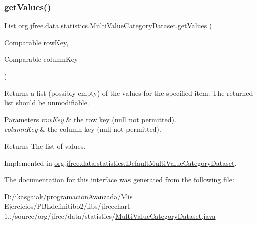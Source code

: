 \subsubsection{\texorpdfstring{get\+Values()}{getValues()}\hspace{0.1cm}{\footnotesize\ttfamily [2/2]}}
{\footnotesize\ttfamily List org.\+jfree.\+data.\+statistics.\+Multi\+Value\+Category\+Dataset.\+get\+Values (\begin{DoxyParamCaption}\item[{Comparable}]{row\+Key,  }\item[{Comparable}]{column\+Key }\end{DoxyParamCaption})}

Returns a list (possibly empty) of the values for the specified item. The returned list should be unmodifiable.


\begin{DoxyParams}{Parameters}
{\em row\+Key} & the row key ({\ttfamily null} not permitted). \\
\hline
{\em column\+Key} & the column key ({\ttfamily null} not permitted).\\
\hline
\end{DoxyParams}
\begin{DoxyReturn}{Returns}
The list of values. 
\end{DoxyReturn}


Implemented in \mbox{\hyperlink{classorg_1_1jfree_1_1data_1_1statistics_1_1_default_multi_value_category_dataset_aeb92fa85eb9b8f780c0b62500989ed22}{org.\+jfree.\+data.\+statistics.\+Default\+Multi\+Value\+Category\+Dataset}}.



The documentation for this interface was generated from the following file\+:\begin{DoxyCompactItemize}
\item 
D\+:/ikasgaiak/programacion\+Avanzada/\+Mis Ejercicios/\+P\+B\+Ldefinitibo2/libs/jfreechart-\/1../source/org/jfree/data/statistics/\mbox{\hyperlink{_multi_value_category_dataset_8java}{Multi\+Value\+Category\+Dataset.\+java}}\end{DoxyCompactItemize}
